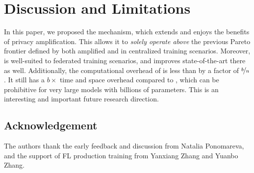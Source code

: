 \documentclass{article}
\begin{document}
\section{Discussion and Limitations}
In this paper, we proposed the \BANDMF mechanism, which extends \MFFTRL and enjoys the benefits of privacy amplification.  This allows it to \emph{solely operate above} the previous Pareto frontier defined by both amplified \dpsgd and \mfftrl in centralized training scenarios.  Moreover, \BANDMF is well-suited to federated training scenarios, and improves state-of-the-art there as well.  Additionally, the computational overhead of \BANDMF is less than \mfftrl by a factor of $\nicefrac{b}{n}$. It still has a $b\times$ time and space overhead compared to \dpsgd, which can be prohibitive for very large models with billions of parameters. This is an interesting and important future research direction.

\subsection*{Acknowledgement}
The authors thank the early feedback and discussion from Natalia Ponomareva, and the support of FL production training from Yanxiang Zhang and Yuanbo Zhang.




\clearpage

\appendix
\end{document}
